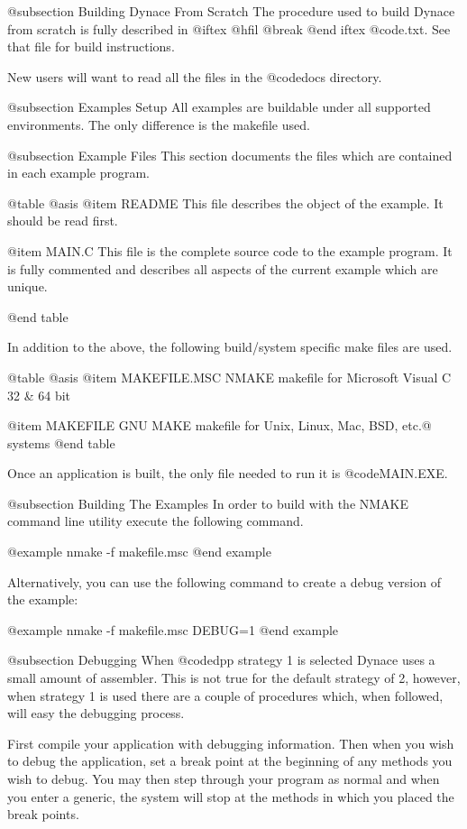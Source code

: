 @subsection Building Dynace From Scratch
The procedure used to build Dynace from scratch is fully described
in 
@iftex
@hfil @break 
@end iftex
@code{\DYNACE\DOCS\BUILD.txt}.  See that file for build instructions.

New users will want to read all the files in the @code{docs} directory.


@subsection Examples Setup
All examples are buildable under all supported environments.  The only
difference is the makefile used.



@subsection Example Files
This section documents the files which are contained in each example
program.

@table @asis
@item README
This file describes the object of the example.  It should be read
first.

@item MAIN.C
This file is the complete source code to the example program.  It is
fully commented and describes all aspects of the current example which
are unique.

@end table


In addition to the above, the following build/system specific make 
files are used.

@table @asis
@item MAKEFILE.MSC
NMAKE makefile for Microsoft Visual C 32 & 64 bit

@item MAKEFILE
GNU MAKE makefile for Unix, Linux, Mac, BSD, etc.@ systems
@end table

Once an application is built, the only file needed to run it is
@code{MAIN.EXE}.



@subsection Building The Examples
In order to build with the NMAKE command line utility execute the
following command.

@example
nmake -f makefile.msc
@end example

Alternatively, you can use the following command to create a debug
version of the example:

@example
nmake -f makefile.msc  DEBUG=1
@end example



@subsection Debugging
When @code{dpp} strategy 1 is selected Dynace uses a small amount of
assembler.  This is not true for the default strategy of 2, however,
when strategy 1 is used there are a couple of procedures which, when
followed, will easy the debugging process.

First compile your application with debugging information.  Then when you
wish to debug the application, set a break point at the beginning of any
methods you wish to debug.  You may then step through your program as
normal and when you enter a generic, the system will stop at the
methods in which you placed the break points.

